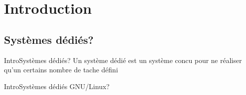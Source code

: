 \section{Introduction}

\subsection{Systèmes dédiés?}
\begin{frame}{Intro}{Systèmes dédiés?}
	Un système dédié est un système concu pour ne réaliser qu'un certains nombre de tache défini
\end{frame}

\begin{frame}{Intro}{Systèmes dédiés GNU/Linux?}
	
\end{frame}
